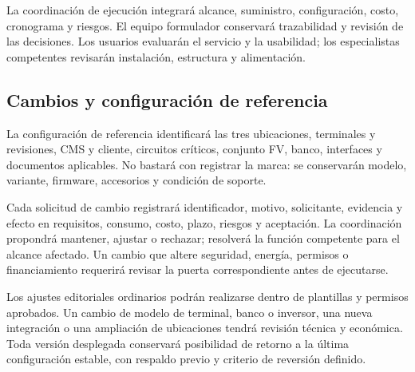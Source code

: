 La coordinación de ejecución integrará alcance, suministro, configuración, costo, cronograma y riesgos. El equipo formulador conservará trazabilidad y revisión de las decisiones. Los usuarios evaluarán el servicio y la usabilidad; los especialistas competentes revisarán instalación, estructura y alimentación.


\subsection{Cambios y configuración de referencia}
La configuración de referencia identificará las tres ubicaciones, terminales y revisiones, CMS y cliente, circuitos críticos, conjunto FV, banco, interfaces y documentos aplicables. No bastará con registrar la marca: se conservarán modelo, variante, firmware, accesorios y condición de soporte.

Cada solicitud de cambio registrará identificador, motivo, solicitante, evidencia y efecto en requisitos, consumo, costo, plazo, riesgos y aceptación. La coordinación propondrá mantener, ajustar o rechazar; resolverá la función competente para el alcance afectado. Un cambio que altere seguridad, energía, permisos o financiamiento requerirá revisar la puerta correspondiente antes de ejecutarse.

Los ajustes editoriales ordinarios podrán realizarse dentro de plantillas y permisos aprobados. Un cambio de modelo de terminal, banco o inversor, una nueva integración o una ampliación de ubicaciones tendrá revisión técnica y económica. Toda versión desplegada conservará posibilidad de retorno a la última configuración estable, con respaldo previo y criterio de reversión definido.

